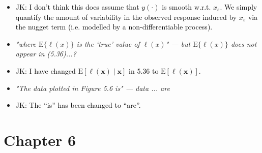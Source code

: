 \documentclass[12pt]{article}
\newcommand{\bx}{\bm{x}}
\newcommand{\E}{\text{E}}
\newcommand{\done}[2]{\item[#1]\textit{#2}}
\newcommand{\jack}[1]{\item{\textcolor{black}{JK: #1}}}
\begin{document}
\begin{itemize}
\jack{I don't think this does assume that $y(\cdot)$ is smooth w.r.t. $x_\varepsilon$. We simply quantify the amount of variability in the observed response induced by $x_\varepsilon$ via the nugget term (i.e. modelled by a non-differentiable process).}

\done{P108}{"where $\E \{\ell(x)\}$ is the ‘true’ value of $\ell(x)$" --- but $\E \{\ell(x)\}$ does not appear in (5.36)...?}

\jack{I have changed $\E[\ell(\bx) \mid \bx]$ in 5.36 to $\E[\ell(\bx)]$.}

\done{P133}{"The data plotted in Figure 5.6 is" --- data ... are}

\jack{The ``is'' has been changed to ``are''.}

\end{itemize}
\newpage
\section{Chapter 6}
\end{document}
